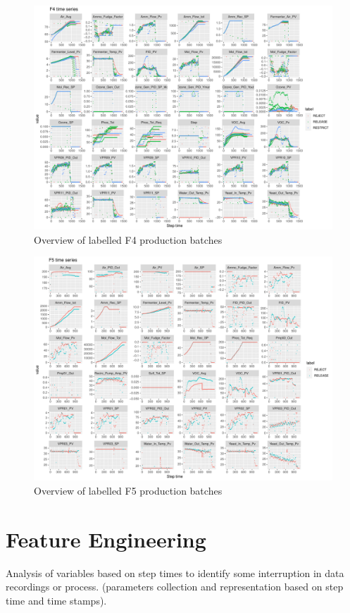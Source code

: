 \documentclass{article}
\begin{document}
\begin{figure}[ht]
    \centering
    \includegraphics[width=1.0\textwidth]{f4_plot}
    \caption{Overview of labelled F4 production batches}
    \label{fig:f4series}
\end{figure}


\begin{figure}[ht]
    \centering
    \includegraphics[width=1.0\textwidth]{f5_plot}
    \caption{Overview of labelled F5 production batches}
    \label{fig:f5series}
\end{figure}

\section{Feature Engineering}
Analysis of variables based on step times to identify some interruption in data recordings or process.  (parameters collection and representation based on step time and time stamps).
\end{document}
